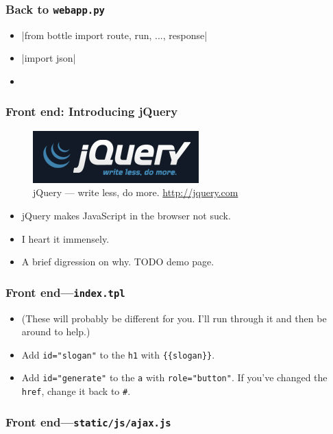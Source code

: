 \documentclass{beamer}
\begin{document}
\begin{frame}[fragile]
  \frametitle{Back to \texttt{webapp.py}}
  \begin{itemize}
  \item {}|from bottle import route, run, ..., response| 
  \item {}|import json|
  \item \inputminted[firstline=21,lastline=24]{python}{../steps/03-frontend/04-demo-app/webapp.py}
  \end{itemize}
\end{frame}

\begin{frame}
  \frametitle{Front end: Introducing jQuery}
  \begin{figure}[h!]
    \centering
    \includegraphics{imgs/jquery_logo}
    \caption{jQuery --- write less, do more. \url{http://jquery.com}}
    \label{fig:jquery}
  \end{figure}
  \begin{itemize}
  \item jQuery makes JavaScript in the browser not suck.
  \item I heart it immensely.
  \item A brief digression on why. TODO demo page.
  \end{itemize}
\end{frame}

\begin{frame}
  \frametitle{Front end---\texttt{index.tpl}}
  \begin{itemize}
  \item (These will probably be different for you. I'll run through it
    and then be around to help.)
  \item Add \texttt{id="slogan"} to the \texttt{h1} with
    \texttt{\{\{slogan\}\}}.
  \item Add \texttt{id="generate"} to the \texttt{a} with
    \texttt{role="button"}. If you've changed the \texttt{href},
    change it back to \texttt{\#}.
  \end{itemize}
\end{frame}

\begin{frame}
  \frametitle{Front end---\texttt{static/js/ajax.js}}
  \inputminted{js}{../steps/03-frontend/04-demo-app/static/js/ajax.js}
\end{frame}
\end{document}
